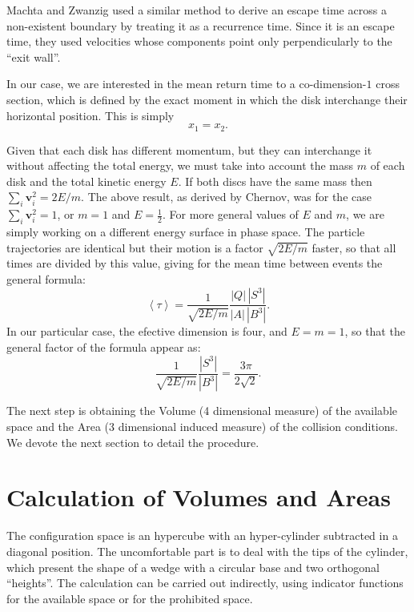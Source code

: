 \documentclass[a4paper,10pt, jcp, aps, preprint]{revtex4-1}
\newcommand{\mean}[1]{\left \langle #1 \right \rangle}
\newcommand{\vv}{\mathbf{v}}
\begin{document}
Machta and Zwanzig \cite{MachtaZwan} used a similar method to derive an escape 
time across a non-existent boundary by treating it as a recurrence time.
Since it is an escape time, they used velocities whose components point only 
perpendicularly to the ``exit wall''.

In our case, we are interested in the mean return time to 
a co-dimension-$1$ cross section, 
which is defined by the exact moment
in which the disk interchange their horizontal position. This is simply
\begin{equation} \label{condchoque}
x_1 = x_2.
\end{equation}

Given that each disk has different momentum, but
they can interchange it without affecting the
total energy, we must take into account the mass $m$ of each disk 
and the total kinetic energy $E$.
If both discs have the same mass then $\sum_i \vv_i^2 = 2E / m$.
The above result, as derived by Chernov, 
was for the case $\sum_i \vv_i^2 = 1$, or $m=1$ and $E=\frac{1}{2}$.  
For more general values of $E$ and $m$, 
we are simply working on a different energy surface in phase space. 
The particle trajectories are identical but their motion is a factor
$\sqrt{2E/m}$ faster, so that all times are divided by this value, 
giving for
the mean time between events the general formula:
\begin{equation} \label{meantimegeneral}
  \mean{\tau} =  \frac{1}{\sqrt{2E / m}} 
\frac{|Q| \, |S^3|} {|A| \, |B^3|}.	
\end{equation}
In our particular case, the efective dimension is four,
and $E=m=1$, so that the general factor of the formula appear as:
\begin{equation} \label{meantimegeneralredux}
   \frac{1}{\sqrt{2E / m}} 
\frac{|S^3|}{|B^3|}=\frac{3\pi}{2\sqrt{2}}.	 
\end{equation}

The next step is obtaining the Volume (4 dimensional measure) of
the available space and the Area (3 dimensional induced measure) of
the collision conditions. We devote the next section to
detail the procedure.


\section{Calculation of Volumes and Areas}

The configuration
space is an hypercube with an hyper-cylinder subtracted in a diagonal position.
The uncomfortable part is to deal with the tips of the cylinder, which
present the  shape of a wedge with a circular base and two 
orthogonal ``heights''. 
The calculation can be carried out indirectly, using indicator functions for the
available space or for the  prohibited space.
\end{document}
